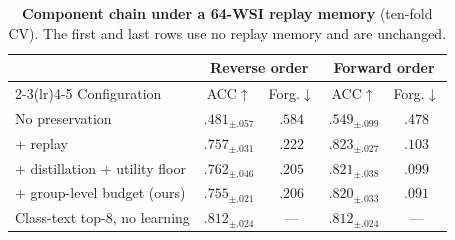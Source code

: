 \begin{table}[!t]
\centering\footnotesize\renewcommand{\arraystretch}{0.93}
\caption{\textbf{Component chain under a 64-WSI replay memory} (ten-fold CV). The first and last rows use no replay memory and are unchanged.}
\label{tab:chain}
\begin{tabular}{lcccc}
\toprule
& \multicolumn{2}{c}{Reverse order} & \multicolumn{2}{c}{Forward order} \\
\cmidrule(lr){2-3}\cmidrule(lr){4-5}
Configuration & ACC$\uparrow$ & Forg.$\downarrow$ & ACC$\uparrow$ & Forg.$\downarrow$ \\
\midrule
No preservation & $.481_{\pm.057}$ & $.584$ & $.549_{\pm.099}$ & $.478$ \\
+ replay & $.757_{\pm.031}$ & $.222$ & $.823_{\pm.027}$ & $.103$ \\
+ distillation + utility floor & $.762_{\pm.046}$ & $.205$ & $.821_{\pm.038}$ & $.099$ \\
+ group-level budget (ours) & $.755_{\pm.021}$ & $.206$ & $.820_{\pm.033}$ & $.091$ \\
\midrule
Class-text top-8, no learning & $.812_{\pm.024}$ & --- & $.812_{\pm.024}$ & --- \\
\bottomrule
\end{tabular}
\end{table}
